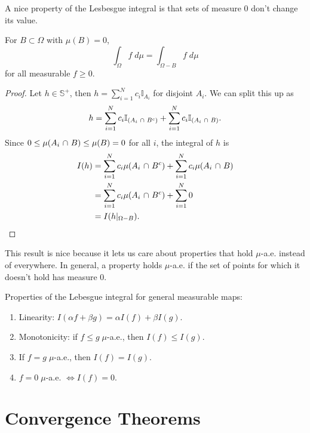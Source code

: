 \documentclass[twoside,10pt]{article}
\begin{document}

A nice property of the Lesbesgue integral is that sets of measure 0 don't change its value.

\begin{prop}
For $B \subset \Omega$ with $\mu(B) = 0$,
\[
\int_{\Omega} f \;d\mu = \int_{\Omega-B} f \;d\mu
\] for all measurable $f \geq 0$.
\end{prop}
\begin{proof}
	Let $h \in \mathbb{S}^{+}$, then $h = \sum_{i=1}^{N} c_{i} \mathbb{I}_{A_{i}}$ for disjoint $A_{i}$. We can split this up as \[
	h = \sum_{i=1}^{N} c_{i}\mathbb{I}_{(A_{i} \operatorname{\,\cap\,} B^{c})} + \sum_{i=1}^{N} c_{i} \mathbb{I}_{(A_{i} \operatorname{\,\cap\,} B)}.
	\] Since $0 \leq \mu(A_{i}\operatorname{\,\cap\,} B) \leq \mu(B) = 0$ for all $i$, the integral of $h$ is
	\begin{align*}
		I(h) &= \sum_{i=1}^{N} c_{i} \mu(A_{i}\operatorname{\,\cap\,} B^{c}) + \sum_{i=1}^{N} c_{i} \mu(A_{i} \operatorname{\,\cap\,} B) \\
		     &= \sum_{i=1}^{N} c_{i} \mu(A_{i}\operatorname{\,\cap\,} B^{c}) + \sum_{i=1}^{N} 0 \\
		     &= I(h|_{\Omega-B}).
	\end{align*}
\end{proof}

This result is nice because it lets us care about properties that hold $\mu$-a.e. instead of everywhere. In general, a property holds $\mu$-a.e. if the set of points for which it doesn't hold has measure 0.

\begin{prop}
Properties of the Lebesgue integral for general measurable maps:
\begin{enumerate}
	\item Linearity: $I(\alpha f + \beta g) = \alpha I(f) + \beta I(g)$.
	\item Monotonicity: if $f \leq g \; \mu$-a.e., then $I(f) \leq I(g)$.
	\item If $f=g\;\mu$-a.e., then $I(f) = I(g)$.
	\item $f=0 \;\mu$-a.e. $\iff I(f) = 0$.
\end{enumerate}
\end{prop}

\section{Convergence Theorems}
\end{document}
